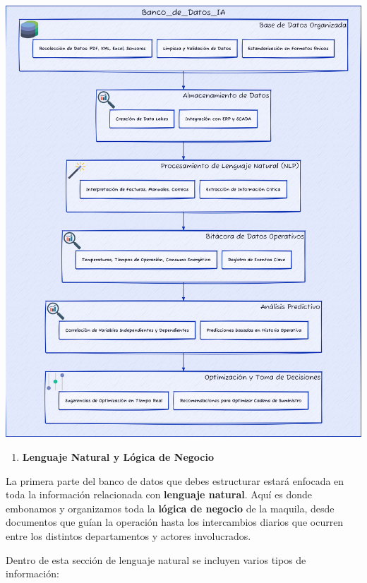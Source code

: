 \documentclass[
  10pt,
  letterpaper,
]{book}
\providecommand{\tightlist}{%
  \setlength{\itemsep}{0pt}\setlength{\parskip}{0pt}}\usepackage{longtable,booktabs,array}
\begin{document}
\includegraphics[width=1\textwidth,height=\textheight]{index_files/mediabag/diagram-7.pdf}

\begin{enumerate}
\def\labelenumi{\arabic{enumi}.}
\tightlist
\item
  \textbf{Lenguaje Natural y Lógica de Negocio}
\end{enumerate}

La primera parte del banco de datos que debes estructurar estará
enfocada en toda la información relacionada con \textbf{lenguaje
natural}. Aquí es donde embonamos y organizamos toda la \textbf{lógica
de negocio} de la maquila, desde documentos que guían la operación hasta
los intercambios diarios que ocurren entre los distintos departamentos y
actores involucrados.

Dentro de esta sección de lenguaje natural se incluyen varios tipos de
información:
\end{document}
